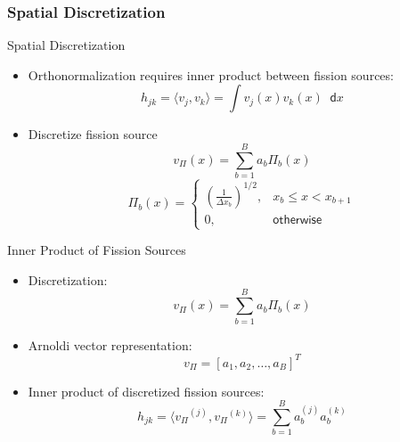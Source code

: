 \documentclass[xcolor={usenames, dvipsnames},]{beamer}
\newcommand{\dd}{\mathop{}\!\mathsf{d}}
\newcommand{\vP}{\ensuremath{v_{\Pi}}}
\begin{document}
\subsubsection{Spatial Discretization}
\begin{frame}{Spatial Discretization}
    \begin{itemize}
        \item Orthonormalization requires inner product between fission sources:
        \begin{equation*}
            h_{jk} = \langle v_j,v_k\rangle = \int v_j(x)v_k(x) \dd x
        \end{equation*}
    \item Discretize fission source
        \begin{equation*}
            \vP(x) = \sum_{b=1}^B a_b \Pi_b(x)
        \end{equation*}
        \begin{equation*}
            \Pi_b(x) = \begin{cases}
                \left(\frac{1}{\Delta x_b}\right)^{1/2}, & x_b \leq x < x_{b+1} \\
                0, & \mathsf{otherwise}
            \end{cases}
        \end{equation*}
    \end{itemize}
\end{frame}

\begin{frame}{Inner Product of Fission Sources}
    \begin{itemize}
        \item Discretization:
        \begin{equation*}
            \vP(x) = \sum_{b=1}^B a_b \Pi_b(x)
        \end{equation*}

        \item Arnoldi vector representation:
        \begin{equation*}
            \vP = \left[a_1, a_2, \ldots, a_B\right]^T
        \end{equation*}

        \item Inner product of discretized fission sources:
        \begin{equation*}
            h_{jk} = \langle \vP^{(j)},\vP^{(k)}\rangle = \sum_{b=1}^B a_b^{(j)}a_b^{(k)}
        \end{equation*}
    \end{itemize}
\end{frame}
\end{document}
